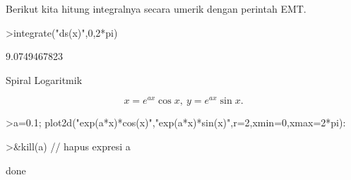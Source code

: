 \documentclass{article}
\begin{document}
\begin{eulernotebook}
\begin{eulercomment}
\begin{eulercomment}
\begin{eulercomment}
\begin{eulercomment}
\begin{eulercomment}
Berikut kita hitung integralnya secara umerik dengan perintah EMT.
\end{eulercomment}
\begin{eulerprompt}
>integrate("ds(x)",0,2*pi)
\end{eulerprompt}
\begin{euleroutput}
  9.0749467823
\end{euleroutput}
\begin{eulercomment}
Spiral Logaritmik\\
\end{eulercomment}
\begin{eulerformula}
\[
 x=e^{ax}\cos x,\ y=e^{ax}\sin x.
\]
\end{eulerformula}
\begin{eulerprompt}
>a=0.1; plot2d("exp(a*x)*cos(x)","exp(a*x)*sin(x)",r=2,xmin=0,xmax=2*pi):
\end{eulerprompt}
\begin{eulerprompt}
>&kill(a) // hapus expresi a
\end{eulerprompt}
\begin{euleroutput}
  
                                   done
  

\end{euleroutput}
\end{eulercomment}
\end{eulercomment}
\end{eulercomment}
\end{eulercomment}
\end{eulernotebook}
\end{document}
